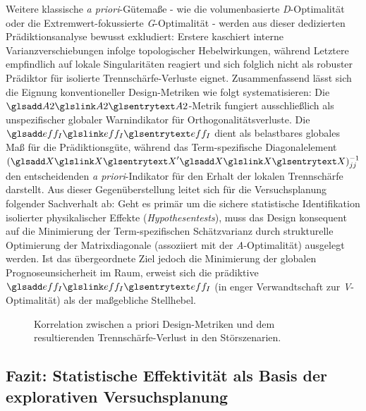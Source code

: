 Weitere klassische \textit{a priori}-Gütemaße - wie die volumenbasierte \textit{D}-Optimalität oder die Extremwert-fokussierte \textit{G}-Optimalität - werden aus dieser dedizierten Prädiktionsanalyse bewusst exkludiert: Erstere kaschiert interne Varianzverschiebungen infolge topologischer Hebelwirkungen, während Letztere empfindlich auf lokale Singularitäten reagiert und sich folglich nicht als robuster Prädiktor für isolierte Trennschärfe-Verluste eignet.
Zusammenfassend lässt sich die Eignung konventioneller Design-Metriken wie folgt systematisieren: Die $\sym{A2}$-Metrik fungiert ausschließlich als unspezifischer globaler Warnindikator für Orthogonalitätsverluste.
Die $\sym{eff_I}$ dient als belastbares globales Maß für die Prädiktionsgüte, während das Term-spezifische Diagonalelement $(\sym{X}'\sym{X})^{-1}_{jj}$ den entscheidenden \textit{a priori}-Indikator für den Erhalt der lokalen Trennschärfe darstellt.
Aus dieser Gegenüberstellung leitet sich für die Versuchsplanung folgender Sachverhalt ab: Geht es primär um die sichere statistische Identifikation isolierter physikalischer Effekte (\textit{Hypothesentests}), muss das Design konsequent auf die Minimierung der Term-spezifischen Schätzvarianz durch strukturelle Optimierung der Matrixdiagonale (assoziiert mit der \textit{A}-Optimalität) ausgelegt werden. Ist das übergeordnete Ziel jedoch die Minimierung der globalen Prognoseunsicherheit im Raum, erweist sich die prädiktive $\sym{eff_I}$ (in enger Verwandtschaft zur \textit{V}-Optimalität) als der maßgebliche Stellhebel.

\begin{figure}[htbp]
    \centering
    \setlength{}
    \setlength\figureheight{4cm}
    
    \caption{Korrelation zwischen a priori Design-Metriken und dem resultierenden Trennschärfe-Verlust in den Störszenarien.}
    \label{fig:ma_abb5.1.4_korrelation}
\end{figure}


\subsection{Fazit: Statistische Effektivität als Basis der explorativen Versuchsplanung} \label{subsec:fazit_sensitivitaet}

